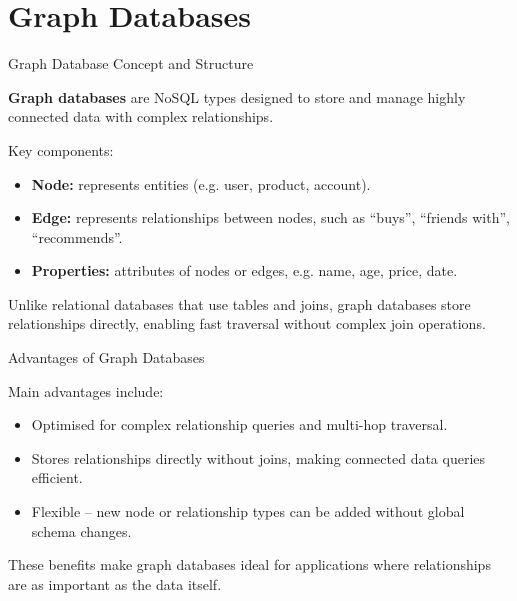 \documentclass[aspectratio=169, table]{beamer}
\begin{document}
\section{Graph Databases}

\begin{frame}{Graph Database Concept and Structure}
	\vspace{20pt}
	
	\textbf{Graph databases} are NoSQL types designed to store and manage highly connected data with complex relationships.
	
	\vspace{10pt}
	Key components:
	\begin{itemize}
		\item \textbf{Node:} represents entities (e.g. user, product, account).
		\item \textbf{Edge:} represents relationships between nodes, such as “buys”, “friends with”, “recommends”.
		\item \textbf{Properties:} attributes of nodes or edges, e.g. name, age, price, date.
	\end{itemize}
	
	Unlike relational databases that use tables and joins, graph databases store relationships directly, enabling fast traversal without complex join operations.
	
\end{frame}

\begin{frame}{Advantages of Graph Databases}
	\vspace{20pt}
	
	Main advantages include:
	
	\begin{itemize}
		\item Optimised for complex relationship queries and multi-hop traversal.
		\item Stores relationships directly without joins, making connected data queries efficient.
		\item Flexible – new node or relationship types can be added without global schema changes.
	\end{itemize}
	
	These benefits make graph databases ideal for applications where relationships are as important as the data itself.
	
\end{frame}
\end{document}
